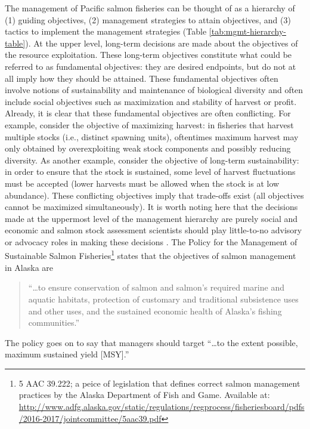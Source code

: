 \documentclass[12pt,]{book}
\let\rmarkdownfootnote\footnote%
\def\footnote{\protect\rmarkdownfootnote}
\theoremstyle{definition}
\theoremstyle{definition}
\theoremstyle{definition}
\theoremstyle{remark}
\begin{document}
The management of Pacific salmon fisheries can be thought of as a
hierarchy of (1) guiding objectives, (2) management strategies to attain
objectives, and (3) tactics to implement the management strategies
(Table \ref{tab:mgmt-hierarchy-table}). At the upper level, long-term
decisions are made about the objectives of the resource exploitation.
These long-term objectives constitute what could be referred to as
fundamental objectives: they are desired endpoints, but do not at all
imply how they should be attained. These fundamental objectives often
involve notions of sustainability and maintenance of biological
diversity and often include social objectives such as maximization and
stability of harvest or profit. Already, it is clear that these
fundamental objectives are often conflicting. For example, consider the
objective of maximizing harvest: in fisheries that harvest multiple
stocks (i.e., distinct spawning units), oftentimes maximum harvest may
only obtained by overexploiting weak stock components and possibly
reducing diversity. As another example, consider the objective of
long-term sustainability: in order to ensure that the stock is
sustained, some level of harvest fluctuations must be accepted (lower
harvests must be allowed when the stock is at low abundance). These
conflicting objectives imply that trade-offs exist (all objectives
cannot be maximized simultaneously). It is worth noting here that the
decisions made at the uppermost level of the management hierarchy are
purely social and economic and salmon stock assessment scientists should
play little-to-no advisory or advocacy roles in making these decisions
\citep{walters-martell-2004}. The Policy for the Management of
Sustainable Salmon Fisheries\footnote{5 AAC 39.222; a peice of
  legislation that defines correct salmon management practices by the
  Alaska Department of Fish and Game. Available at:
  \url{http://www.adfg.alaska.gov/static/regulations/regprocess/fisheriesboard/pdfs/2016-2017/jointcommittee/5aac39.pdf}}
states that the objectives of salmon management in Alaska are

\begin{quote}
``\ldots{}to ensure conservation of salmon and salmon's required marine
and aquatic habitats, protection of customary and traditional
subsistence uses and other uses, and the sustained economic health of
Alaska's fishing communities.''
\end{quote}

\noindent
The policy goes on to say that managers should target ``\ldots{}to the
extent possible, maximum sustained yield {[}MSY{]}.''
\end{document}
